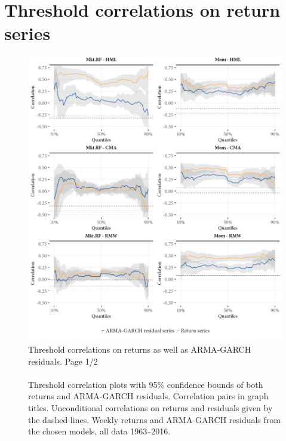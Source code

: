 
\section{Threshold correlations on return series}
\label{app:threshold_return}
\begin{figure}[H]
  \centering
  \footnotesize
  \caption{Threshold correlations on returns as well as ARMA-GARCH residuals. Page 1/2 \\ \quad \\
  Threshold correlation plots with 95\% confidence bounds of both returns and ARMA-GARCH residuals. Correlation pairs in graph titles. Unconditional correlations on returns and residuals given by the dashed lines. Weekly returns and ARMA-GARCH residuals from the chosen models, all data 1963--2016.}
  \label{fig:appendix_threshold1}
  \includegraphics[scale=1]{graphics/appendix_threshold_1.png}  
\end{figure}
